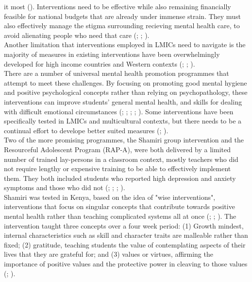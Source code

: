 \documentclass[stu,a4paper,12pt]{apa7}
\begin{document}
it most (\cite{docetal19}). Interventions need to be effective while also
remaining financially feasible for national budgets that are already under
immense strain. They must also effectively manage the stigma surrounding
recieving mental health care, to avoid alienating people who need that care
(\cite{Osetal20b}; \cite{Osetal20}; \cite{Oseral21}). \\
Another limitation that interventions employed in LMICs need to navigate is the
majority of measures in existing interventions have been overwhelmingly
developed for high income countries and Western contexts (\cite{barryetal13};
\cite{oretal18}; \cite{Osetal20}). \\
There are a number of universal mental health promotion programmes that attempt
to meet these challenges. By focusing on promoting good mental hygiene and
positive psychological concepts rather than relying on psychopathology, these
interventions can improve students' general mental health, and skills for
dealing with difficult emotional circumstances (\cite{barryetal13};
\cite{oretal18}; \cite{Osetal20}; \cite{Oseral21}; \cite{riduvetal11}).
Some interventions have been specifically tested in LMICs and multicultural
contexts, but there needs to be a continual effort to develope better suited
measures (\cite{barryetal13}; \cite{Osetal20}). \\
Two of the more promising programmes, the Shamiri group intervention
and the Resourceful Adolescent Program (RAP-A), were both delivered by
a limited number of trained lay-persons in a classroom context, mostly teachers
who did not require lengthy or expensive training to be able to effectively
implement them. They both included students who reported high depression and
anxiety symptoms and those who did not (\cite{Osetal20b}; \cite{Osetal20};
\cite{Oseral21}; \cite{riduvetal11}). \\
Shamiri was tested in Kenya, based on the idea of "wise interventions",
interventions that focus on singular concepts that contribute towards positive
mental health rather than teaching complicated systems all at once (\cite{Osetal20b};
\cite{Osetal20}; \cite{Oseral21}). The intervention taught three concepts over
a four week period: (1) Growth mindest, internal characteristics
such as skill and character traits are malleable rather than fixed; (2)
gratitude, teaching students the value of contemplating aspects of their lives
that they are grateful for; and (3) values or virtues, affirming the importance
of positive values and the protective power in cleaving to those values (\cite{Osetal20b}; \cite{Oseral21}).
\end{document}
